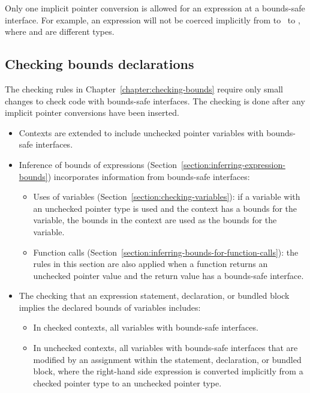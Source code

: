 Only one implicit pointer conversion is allowed for an expression at a bounds-safe
interface.  For example, an expression will not be
coerced implicitly from  to \uncheckedptrvoid\ to
, where  and  are different types.

\subsection{Checking bounds declarations}
\label{section:checking-bounds-interfaces}

The checking rules in Chapter~\ref{chapter:checking-bounds} require
only small changes to check code with bounds-safe interfaces.  The
checking is done after any implicit pointer conversions have been
inserted.
\begin{itemize}
\item Contexts are extended to include unchecked pointer variables with
      bounds-safe interfaces.
\item Inference of bounds of expressions (Section~\ref{section:inferring-expression-bounds}) incorporates information from bounds-safe interfaces:
\begin{itemize}
\item Uses of variables (Section~\ref{section:checking-variables}): 
      if a variable with an unchecked pointer type is used and the context has
      a bounds for the variable, the bounds in the context are used as the bounds
      for the variable.
\item Function calls (Section~\ref{section:inferring-bounds-for-function-calls}): 
      the rules in this section are also applied when a function returns an unchecked
      pointer value and the return value has a bounds-safe interface.
\end{itemize}
\item The checking that an expression statement, declaration, or bundled
      block implies the declared bounds of variables includes:
\begin{itemize}
\item In checked contexts, all variables with bounds-safe interfaces.
\item In unchecked contexts, all variables with bounds-safe interfaces
      that are modified by an assignment within the statement, declaration,
      or bundled block, where the right-hand side expression
      is converted implicitly from a checked pointer type to an unchecked pointer type.
\end{itemize}

\end{itemize}
